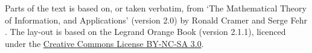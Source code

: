 \documentclass[11pt,fleqn]{book} %
\begin{document}


\noindent Parts of the text is based on, or taken verbatim, from `The Mathematical Theory of Information, and Applications' (version 2.0) by Ronald Cramer and Serge Fehr \CF. The lay-out is based on the Legrand Orange Book (version 2.1.1), licenced under the \href{https://creativecommons.org/licenses/by-nc-sa/3.0/}{Creative Commons License BY-NC-SA 3.0}.\\




\usechapterimagefalse %


\pagestyle{empty} %

\tableofcontents %

\cleardoublepage %

\pagestyle{fancy} %




\newcommand{\N}{\mathbb{N}}
\newcommand{\R}{\mathbb{R}}
\newcommand{\im}{\mathrm{im}}
\newcommand{\set}[1]{\{#1\}}
\newcommand{\Set}[2]{\{#1\,|\,#2\}}
\newcommand{\SET}[3][\big]{#1\{#2\,#1|\,#3#1\}}

\newcommand{\evA}{\mathcal{A}}
\newcommand{\evB}{\mathcal{B}}
\end{document}
